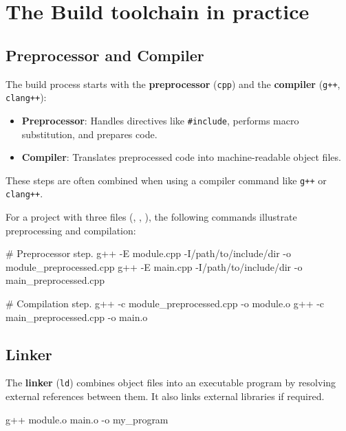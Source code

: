 \newpage

\section{The Build toolchain in practice}

\subsection{Preprocessor and Compiler}

The build process starts with the \textbf{preprocessor} (\texttt{cpp}) and the \textbf{compiler} (\texttt{g++}, \texttt{clang++}):
\begin{itemize}
    \item \textbf{Preprocessor}: Handles directives like \texttt{\#include}, performs macro substitution, and prepares code.
    \item \textbf{Compiler}: Translates preprocessed code into machine-readable object files.
    \end{itemize}

These steps are often combined when using a compiler command like \texttt{g++} or \texttt{clang++}.


    For a project with three files (, , ), the following commands illustrate preprocessing and compilation:
    
    \begin{codeblock}[language=bash, numbers=none]
# Preprocessor step.
g++ -E module.cpp -I/path/to/include/dir -o module_preprocessed.cpp
g++ -E main.cpp -I/path/to/include/dir -o main_preprocessed.cpp

# Compilation step.
g++ -c module_preprocessed.cpp -o module.o
g++ -c main_preprocessed.cpp -o main.o
    \end{codeblock}


\subsection{Linker}

The \textbf{linker} (\texttt{ld}) combines object files into an executable program by resolving external references between them. It also links external libraries if required.


    \begin{codeblock}[language=bash, numbers=none]
g++ module.o main.o -o my_program
    \end{codeblock}


